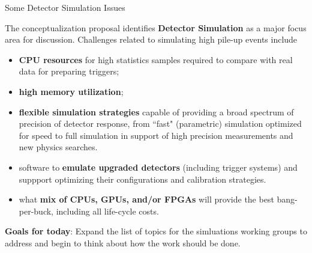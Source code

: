 \documentclass[compress,10]{beamer}
\begin{document}

\begin{frame}{Some Detector Simulation Issues}{}
{\footnotesize
The conceptualization proposal identifies \textcolor{brickred}{\bf
Detector Simulation} as a major focus area for discussion.
Challenges related to simulating high pile-up events include
\begin{itemize}
 \item
   \textcolor{brickred}{\bf CPU resources}
    for high statistics samples required to compare with
   real data for preparing triggers;
 \item
   \textcolor{brickred}{\bf high memory utilization};
 \item
   \textcolor{brickred}{\bf
   flexible simulation strategies} capable of providing a broad spectrum
   of precision of detector response, from ``fast" (parametric) simulation
   optimized for speed to full simulation in support of high precision
   measurements and new physics searches.
  \item
   software to \textcolor{brickred}{\bf emulate upgraded detectors}
   (including trigger systems) and
   suppport optimizing their configurations and calibration strategies.
  \item
   what \textcolor{brickred}{\bf mix of CPUs, GPUs, and/or FPGAs}
   will provide the 
   best bang-per-buck, including all life-cycle costs.
\end{itemize}
\vskip 0.1in
\noindent
\textcolor{brickred}{\bf Goals for today}:
Expand the list of topics for the simluations working groups to 
address and begin to think about how the work should be done.


}  %

\end{frame}
\end{document}
